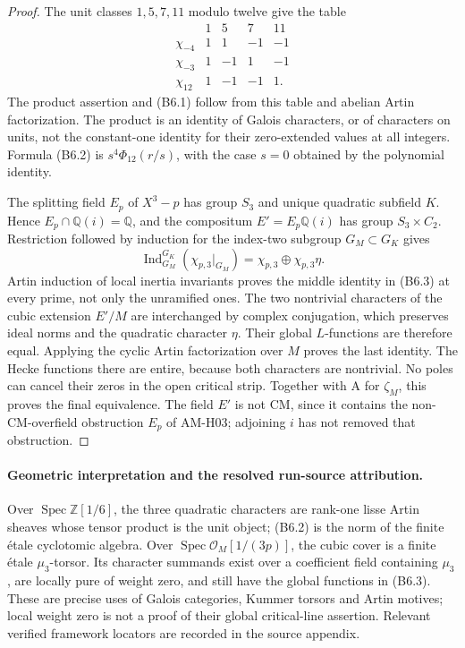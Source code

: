\begin{proof}
The unit classes $1,5,7,11$ modulo twelve give the table
\[
\begin{array}{c|rrrr}
 &1&5&7&11\\\hline
 \chi_{-4}&1&1&-1&-1\\
 \chi_{-3}&1&-1&1&-1\\
 \chi_{12}&1&-1&-1&1.
\end{array}
\]
The product assertion and (B6.1) follow from this table
and abelian Artin factorization. The product is an
identity of Galois characters, or of characters on
units, not the constant-one identity for their
zero-extended values at all integers. Formula (B6.2)
is $s^4\Phi_{12}(r/s)$, with the case $s=0$ obtained
by the polynomial identity.

The splitting field $E_p$ of $X^3-p$ has group $S_3$
and unique quadratic subfield $K$. Hence
$E_p\cap\mathbb Q(i)=\mathbb Q$, and the compositum
$E'=E_p\mathbb Q(i)$ has group $S_3\times C_2$.
Restriction followed by induction for the index-two
subgroup $G_M\subset G_K$ gives
\[
 \operatorname{Ind}_{G_M}^{G_K}
      (\chi_{p,3}|_{G_M})
              =\chi_{p,3}\oplus\chi_{p,3}\eta.
\]
Artin induction of local inertia invariants proves
the middle identity in (B6.3) at every prime, not only
the unramified ones. The two nontrivial characters
of the cubic extension $E'/M$ are interchanged by
complex conjugation, which preserves ideal norms
and the quadratic character $\eta$. Their global
$L$-functions are therefore equal. Applying the
cyclic Artin factorization over $M$ proves the last
identity. The Hecke functions there are entire,
because both characters are nontrivial. No poles
can cancel their zeros in the open critical strip.
Together with A for $\zeta_M$, this proves the final
equivalence. The field $E'$ is not CM, since it
contains the non-CM-overfield obstruction $E_p$
of AM-H03; adjoining $i$ has not removed that
obstruction.
\end{proof}

\paragraph{Geometric interpretation and the resolved run-source attribution.}
Over $\operatorname{Spec}\mathbb Z[1/6]$, the three
quadratic characters are rank-one lisse Artin sheaves
whose tensor product is the unit object; (B6.2) is the
norm of the finite \'etale cyclotomic algebra. Over
$\operatorname{Spec}\mathcal O_M[1/(3p)]$, the cubic
cover is a finite \'etale $\mu_3$-torsor. Its character
summands exist over a coefficient field containing
$\mu_3$, are locally pure of weight zero, and still
have the global functions in (B6.3). These are precise
uses of Galois categories, Kummer torsors and Artin
motives; local weight zero is not a proof of their
global critical-line assertion. Relevant verified
framework locators are recorded in the source appendix.

